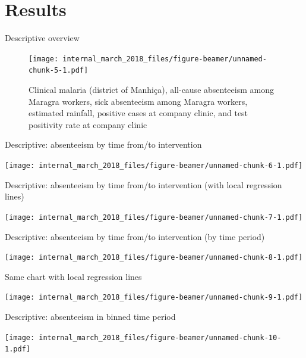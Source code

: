 \documentclass[ignorenonframetext,]{beamer}
\begin{document}
\section{Results}\label{results}

\begin{frame}{Descriptive overview}

\begin{figure}
\centering
\texttt{[image: internal\_march\_2018\_files/figure-beamer/unnamed-chunk-5-1.pdf]}
\caption{Clinical malaria (district of Manhiça), all-cause absenteeism
among Maragra workers, sick absenteeism among Maragra workers, estimated
rainfall, positive cases at company clinic, and test positivity rate at
company clinic}
\end{figure}

\end{frame}

\begin{frame}{Descriptive: absenteeism by time from/to intervention}

\texttt{[image: internal\_march\_2018\_files/figure-beamer/unnamed-chunk-6-1.pdf]}

\end{frame}

\begin{frame}{Descriptive: absenteeism by time from/to intervention
(with local regression lines)}

\texttt{[image: internal\_march\_2018\_files/figure-beamer/unnamed-chunk-7-1.pdf]}

\end{frame}

\begin{frame}{Descriptive: absenteeism by time from/to intervention (by
time period)}

\texttt{[image: internal\_march\_2018\_files/figure-beamer/unnamed-chunk-8-1.pdf]}

\end{frame}

\begin{frame}{Same chart with local regression lines}

\texttt{[image: internal\_march\_2018\_files/figure-beamer/unnamed-chunk-9-1.pdf]}

\end{frame}

\begin{frame}{Descriptive: absenteeism in binned time period}

\texttt{[image: internal\_march\_2018\_files/figure-beamer/unnamed-chunk-10-1.pdf]}

\end{frame}
\end{document}
